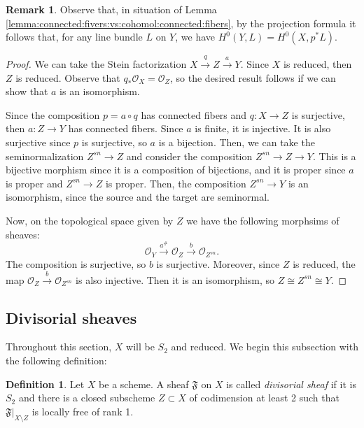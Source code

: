\documentclass{amsart}
\newcommand{\cO}{\mathcal{O}}
\theoremstyle{definition}
\newtheorem{Def}[theorem]{Definition}
\newtheorem{Remark}[theorem]{Remark}
\def\subs#1.{_{#1}}
\begin{document}
\begin{Remark}\label{remark:cohom:connected:implies:one:can:take:global:sections:after:pull:back}
Observe that, in situation of Lemma \ref{lemma:connected:fivers:vs:cohomol:connected:fibers}, by the projection formula it follows that, for any line bundle $L$ on $Y$, we have $H^0(Y,L) =H^0(X,p^*L)$.
\end{Remark}

\begin{proof}
We can take the Stein factorization $X\xrightarrow{q} Z\xrightarrow{a} Y$.
Since $X$ is reduced, then $Z$ is reduced.
Observe that $q_*\cO_X = \cO_Z$, so the desired result follows if we can show that $a$ is an isomorphism.

Since the composition $p=a \circ q$ has connected fibers and $q \colon X\to Z$ is surjective, then $a \colon Z\to Y$ has connected fibers.
Since $a$ is finite, it is injective.
It is also surjective since $p$ is surjective, so $a$ is a bijection.
Then, we can take the seminormalization $Z^{sn}\to Z$ and consider the composition $Z^{sn}\to Z \to Y$.
This is a bijective morphism since it is a composition of bijections, and it is proper since $a$ is proper and $Z^{sn}\to Z$ is proper.
Then, the composition $Z^{sn} \to Y$ is an isomorphism, since the source and the target are seminormal.

Now, on the topological space given by $Z$ we have the following morphsims of sheaves:
$$\cO_Y\xrightarrow{a^\#} \cO_Z\xrightarrow{b} \cO_{Z^{sn}}.$$
The composition is surjective, so $b$ is surjective. Moreover, since $Z$ is reduced, the map $\cO_Z\xrightarrow{b} \cO_{Z^{sn}}$ is also injective. Then it is an isomorphism, so $Z\cong Z^{sn}\cong Y$.
\end{proof}




\subsection{Divisorial sheaves}\label{divisorial sheaves}
Throughout this section, $X$ will be $S_2$ and reduced. We begin this subsection with the following definition:

\begin{Def}Let $X$ be a scheme.
A sheaf $\mathfrak F$ on $X$ is called \emph{divisorial sheaf} if it is $S_2$ and there is a closed subscheme $Z \subset X$ of codimension at least 2 such that $\mathfrak F | \subs X \setminus Z.$ is locally free of rank 1.\end{Def}
\end{document}
